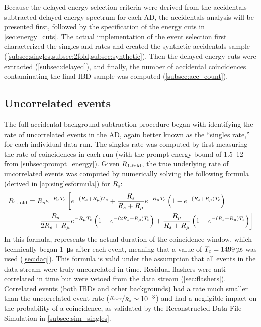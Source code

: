 Because the delayed energy selection criteria
were derived from the accidentals-subtracted delayed energy spectrum for each AD,
the accidentals analysis will be presented first,
followed by the specification of the energy cuts in \cref{sec:energy_cuts}.
The actual implementation of the event selection
first characterized the singles and  rates
and created the synthetic accidentals sample
(\cref{subsec:singles,subsec:2fold,subsec:synthetic}).
Then the delayed energy cuts were extracted (\cref{subsec:delayed}),
and finally, the number of accidental coincidences
contaminating the final IBD sample was computed (\cref{subsec:acc_count}).

\subsection{Uncorrelated events}
\label{subsec:singles}

The full accidental background subtraction procedure began with identifying
the rate of uncorrelated events in the AD, again better known
as the ``singles rate,'' for each individual data run.
The singles rate was computed by first measuring the rate of
 coincidences in each run
(with the prompt energy bound of \SIrange{1.5}{12}{\mev} from \cref{subsec:prompt_energy}).
Given $R_\text{\ensuremath{1}-fold}$, the true underlying rate of uncorrelated events was
computed by numerically solving the following formula
(derived in \cref{ap:singlesformula}) for $R_s$:
\begin{align}
    \label{eq:rsingles}
    \begin{split}
        R_{\text{\fold{1}}}
          &= R_s e^{-R_s\tc}
          \left[
              e^{-(R_s + R_\mu)\tc} +
              \frac{R_s}{R_s+R_\mu} e^{-R_\mu\tc}
              \left(
                  1 - e^{-(R_s + R_\mu)\tc}
              \right)
          \right. \\
          &\ \ %
          \left. - \frac{R_s}{2R_s + R_\mu} e^{-R_\mu\tc}
              \left(
                  1 - e^{-(2R_s + R_\mu)\tc}
              \right) +
              \frac{R_\mu}{R_s + R_\mu}
              \left(
                  1 - e^{-(R_s + R_\mu)\tc}
              \right)
          \right]
    \end{split}
\end{align}
In this formula, \tc{} represents the actual duration of the coincidence window,
which technically began \SI{1}{\micro\second} after each event,
meaning that a value of $T_c=\SI{1499}{\micro\second}$ was used (\cref{sec:daq}).
This formula is valid under the assumption that all
events in the data stream were truly uncorrelated in time.
Residual flashers were anti-correlated in time
but were vetoed from the data stream (\cref{sec:flashers}).
Correlated events (both IBDs and other backgrounds)
had a rate much smaller than the uncorrelated event rate
($\nicefrac{R_{\text{corr}}}{R_s} \sim 10^{-3}$)
and had a negligible impact on the probability of a  coincidence,
as validated by the Reconstructed-Data File Simulation in \cref{subsec:sim_singles}.

